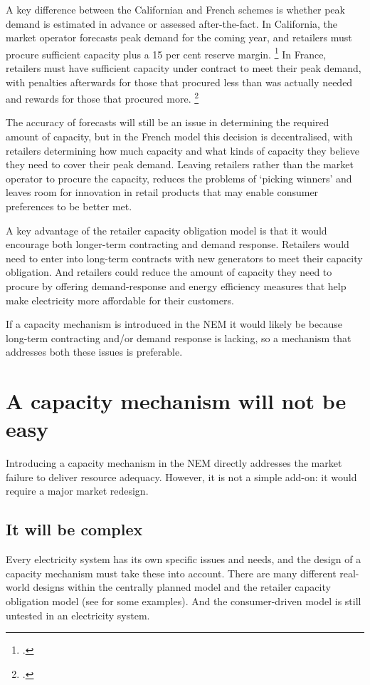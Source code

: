 \documentclass[FrontPage]{grattan}
\begin{document}
A key difference between the Californian and French schemes is whether peak demand is estimated in advance or assessed after-the-fact. In California, the market operator forecasts peak demand for the coming year, and retailers must procure sufficient capacity plus a 15 per cent reserve margin.%
\footcite{CPUC2017ResourceAdequacy}
In France, retailers must have sufficient capacity under contract to meet their peak demand, with penalties afterwards for those that procured less than was actually needed and rewards for those that procured more.%
\footcite{RTE2017CapacityObligation}

The accuracy of forecasts will still be an issue in determining the required amount of capacity, but in the French model this decision is decentralised, with retailers determining how much capacity and what kinds of capacity they believe they need to cover their peak demand. Leaving retailers rather than the market operator to procure the capacity, reduces the problems of `picking winners' and leaves room for innovation in retail products that may enable consumer preferences to be better met.

A key advantage of the retailer capacity obligation model is that it would encourage both longer-term contracting and demand response. Retailers would need to enter into long-term contracts with new generators to meet their capacity obligation. And retailers could reduce the amount of capacity they need to procure by offering demand-response and energy efficiency measures that help make electricity more affordable for their customers. 

If a capacity mechanism is introduced in the NEM it would likely be because long-term contracting and/or demand response is lacking, so a mechanism that addresses both these issues is preferable.

\section{A capacity mechanism will not be easy}\label{sec:a-capacity-mechanism-will-not-be-easy} 
Introducing a capacity mechanism in the NEM directly addresses the market failure to deliver resource adequacy. However, it is not a simple add-on: it would require a major market redesign.

\subsection{It will be complex}\label{subsec:a-capacity-mechanism-will-be-complex} 
Every electricity system has its own specific issues and needs, and the design of a capacity mechanism must take these into account. There are many different real-world designs within the centrally planned model and the retailer capacity obligation model (see  for some examples). And the consumer-driven model is still untested in an electricity system. 
\end{document}
